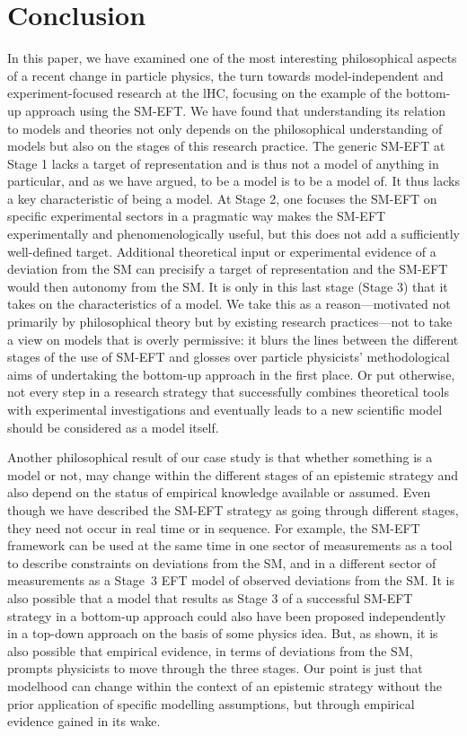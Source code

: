 \section{Conclusion}


In this paper, we have examined one of the most interesting philosophical aspects of a recent change in particle physics, the turn towards model-independent and experiment-focused research at the lHC, focusing on the example of the bottom-up approach using the SM-EFT. 
We have found that understanding its relation to models and theories not only depends on the philosophical understanding of models but also on the stages of this research practice. 
The generic SM-EFT at Stage 1 lacks a target of representation and is thus not a model of anything in particular, and as we have argued, to be a model is to be a model of. 
It thus lacks a key characteristic of being a model. 
At Stage 2, one focuses the SM-EFT on specific experimental sectors in a pragmatic way makes the SM-EFT experimentally and phenomenologically useful, but this does not add a sufficiently well-defined target. 
Additional theoretical input or experimental evidence of a deviation from the SM can precisify a target of representation and the SM-EFT would then autonomy from the SM. 
It is only in this last stage (Stage 3) that it takes on the characteristics of a model.
We take this as a reason---motivated not primarily by philosophical theory but by existing research practices---not to take a view on models that is overly permissive: it blurs the lines between the different stages of the use of SM-EFT and glosses over particle physicists' methodological aims of undertaking the bottom-up approach in the first place. 
Or put otherwise, not every step in a research strategy that successfully combines theoretical tools with experimental investigations and eventually leads to a new scientific model should be considered as a model itself.

Another philosophical result of our case study is that whether something is a model or not, may change within the different stages of an epistemic strategy and also depend on the status of empirical knowledge available or assumed.
Even though we have described the SM-EFT strategy as going through different stages, they need not occur in real time or in sequence. 
For example, the SM-EFT framework can be used at the same time in one sector of measurements as a tool to describe constraints on deviations from the SM, and in a different sector of measurements as a Stage~3 EFT model of observed deviations from the SM.
It is also possible that a model that results as Stage 3 of a successful SM-EFT strategy in a bottom-up approach could also have been proposed independently in a top-down approach on the basis of some physics idea.
But, as shown, it is also possible that empirical evidence, in terms of deviations from the SM, prompts physicists to move through the three stages. 
Our point is just that modelhood can change within the context of an epistemic strategy without the prior application of specific modelling assumptions, but through empirical evidence gained in its wake.







